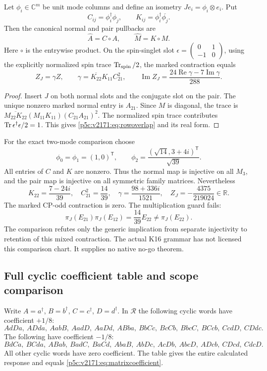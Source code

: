 \documentclass[11pt,a4paper]{article}
\begin{document}
Let $\phi_i\in\mathbb C^m$ be unit mode columns and define an isometry
$Je_i=\phi_i\otimes e_i$. Put
\[
 C_{ij}=\phi_i^\dagger\phi_j,\qquad
 K_{ij}=\phi_i^\dagger\overline{\phi_j}.
\]
Then the canonical normal and pair pullbacks are
\[
 \widehat A=C\circ A,\qquad \widehat M=K\circ M.
\]
Here $\circ$ is the entrywise product. On the spin-singlet slot
$\epsilon=\left(\begin{smallmatrix}0&1\\-1&0\end{smallmatrix}\right)$,
using the explicitly normalized spin trace $\operatorname{Tr}_{\rm spin}/2$, the marked
contraction equals
\begin{equation}\label{p5c:v2171:eq:rowoverlap}
 Z_J=\gamma Z,\qquad
 \gamma=\overline{K_{22}}K_{11}C_{21}^2,
 \qquad \operatorname{Im}Z_J=
       \frac{24\operatorname{Re}\gamma-7\operatorname{Im}\gamma}{288}.
\end{equation}
\begin{proof}
Insert $J$ on both normal slots and the conjugate slot on the pair.
The unique nonzero marked normal entry is $A_{21}$. Since $M$ is diagonal,
the trace is
$\overline{M_{22}K_{22}}(M_{11}K_{11})(C_{21}A_{21})^2$.
The normalized spin trace contributes
$\operatorname{Tr}\epsilon^\dagger\epsilon/2=1$. This gives
\eqref{p5c:v2171:eq:rowoverlap} and its real form.
\end{proof}

For the exact two-mode comparison choose
\[
 \phi_0=\phi_1=(1,0)^{\mathsf T},\qquad
 \phi_2=\frac{(\sqrt{14},3+4i)^{\mathsf T}}{\sqrt{39}}.
\]
All entries of $C$ and $K$ are nonzero. Thus the normal map is injective on
all $M_3$, and the pair map is injective on all symmetric family matrices.
Nevertheless
\[
 K_{22}=\frac{7-24i}{39},\quad C_{21}^2=\frac{14}{39},\quad
 \gamma=\frac{98+336i}{1521},\quad
 Z_J=-\frac{4375}{219024}\in\mathbb R.
\]
The marked CP-odd contraction is zero. The multiplication guard fails:
\[
 \pi_J(E_{21})\pi_J(E_{12})=\frac{14}{39}E_{22}
 \ne \pi_J(E_{22}).
\]
The comparison refutes only the generic implication from separate
injectivity to retention of this mixed contraction. The actual K16 grammar
has not licensed this comparison chart. It supplies no native no-go theorem.

\subsection{Full cyclic coefficient table and scope comparison}
\label{p5c:v2171:app:matrixscope}
Write $A=a^\dagger$, $B=b^\dagger$, $C=c^\dagger$, $D=d^\dagger$.
In $\mathcal R$ the following cyclic words have coefficient $+1/8$:
\[
 AdDa,\ ADda,\ AabB,\ AadD,\ AaDd,\ ABba,\
 BbCc,\ BcCb,\ BbcC,\ BCcb,\ CcdD,\ CDdc.
\]
The following have coefficient $-1/8$:
\[
 BdCa,\ BCda,\ ABab,\ BadC,\ BaCd,\ AbaB,\
 AbDc,\ AcDb,\ AbcD,\ ADcb,\ CDcd,\ CdcD.
\]
All other cyclic words have zero coefficient. The table gives the entire
calculated response and equals \eqref{p5c:v2171:eq:matrixcoefficient}.
\end{document}
